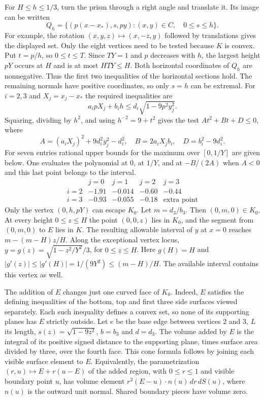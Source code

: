 For $H\le h\le1/3$, turn the prism through a right angle and translate it.
Its image can be written
\[
 Q_h=\{(p(x-x_*),s,py):(x,y)\in C,\quad 0\le s\le h\}.
\]
For example, the rotation $(x,y,z)\mapsto(x,-z,y)$ followed by translations
gives the displayed set. Only the eight vertices need to be tested because
$K$ is convex. Put $t=p/h$, so $0\le t\le T$. Since $TY=1$ and $p$
decreases with $h$, the largest height $pY$ occurs at $H$ and is at
most $HTY\le H$. Both horizontal coordinates of $Q_h$ are nonnegative.
Thus the first two inequalities of the horizontal sections hold.
The remaining normals have positive coordinates, so only $s=h$ can be
extremal. For $i=2,3$ and $X_j=x_j-x_*$ the required inequalities are
\[
 a_i p X_j+b_i h\le d_i\sqrt{1-9p^2 y_j^2}.
\]
Squaring, dividing by $h^2$, and using $h^{-2}=9+t^2$ gives the test
$A t^2+B t+D\le0$, where
\[
 A=(a_i X_j)^2+9d_i^2y_j^2-d_i^2,\quad B=2a_iX_j b_i,\quad
 D=b_i^2-9d_i^2.
\]
For seven entries rational upper bounds for the maximum over $[0,1/Y]$
are given below. One evaluates the polynomial at $0$, at $1/Y$, and at
$-B/(2A)$ when $A<0$ and this last point belongs to the interval.
\[
\begin{array}{c|rrrr}
 &j=0&j=1&j=2&j=3\\\hline
 i=2&-1.91&-0.014&-0.60&-0.44\\
 i=3&-0.93&-0.055&-0.18&\text{extra point}
\end{array}
\]
Only the vertex $(0,h,pY)$ can escape $K_0$. Let $m=d_3/b_3$.
Then $(0,m,0)\in K_0$. At every height $0\le z\le H$ the point $(0,0,z)$
lies in $K_0$, and the segment from $(0,m,0)$ to $E$ lies in $K$.
The resulting allowable interval of $y$ at $x=0$ reaches
$m-(m-H)z/H$. Along the exceptional vertex locus,
$y=g(z)=\sqrt{1-z^2/Y^2}/3$, for $0\le z\le H$.
Here $g(H)=H$ and $|g'(z)|\le |g'(H)|=1/(9Y^2)\le(m-H)/H$.
The available interval contains this vertex as well.

The addition of $E$ changes just one curved face of $K_0$.
Indeed, $E$ satisfies the defining inequalities of the bottom, top and
first three side surfaces viewed separately. Each such inequality defines
a convex set, so none of its supporting planes has $E$ strictly outside.
Let $e$ be the base edge between vertices 2 and 3, $L$ its length,
$s(z)=\sqrt{1-9z^2}$, $b=b_3$ and $d=d_3$.
The volume added by $E$ is the integral of its positive signed distance to
the supporting plane, times surface area divided by three, over the fourth
face. This cone formula follows by joining each visible surface element to
$E$. Equivalently, the parametrization $(r,u)\mapsto E+r(u-E)$ of the added
region, with $0\le r\le1$ and visible boundary point $u$, has volume
element $r^2(E-u)\cdot n(u)\,dr\,dS(u)$, where $n(u)$ is the outward
unit normal. Shared boundary pieces have volume zero.

